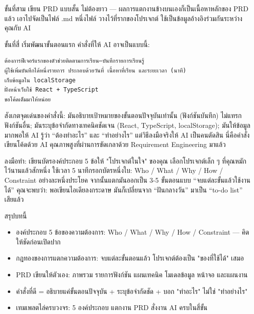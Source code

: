 ขั้นที่สาม เขียน PRD แบบสั้น ไม่ต้องยาว — ผลการแตกงานข้างบนเองก็เป็นเนื้อหาหลักของ PRD แล้ว เอาไปจัดเป็นไฟล์ .md หนึ่งไฟล์ วางไว้ที่รากของโปรเจกต์ ใช้เป็นข้อมูลอ้างอิงร่วมกันระหว่างคุณกับ AI

ขั้นที่สี่ เริ่มพัฒนาขั้นตอนแรก คำสั่งที่ให้ AI อาจเป็นแบบนี้:

\begin{lstlisting}
ต้องการฟีเจอร์แรกของตัวช่วยติดตามการเรียน—บันทึกรายการเรียนรู้
ผู้ใช้เพิ่มบันทึกได้หนึ่งรายการ ประกอบด้วยวันที่ เนื้อหาที่เรียน และระยะเวลา (นาที)
เก็บข้อมูลใน localStorage
ฝั่งหน้าเว็บใช้ React + TypeScript
ขอโค้ดเต็มมาให้หน่อย
\end{lstlisting}

สังเกตจุดเด่นของคำสั่งนี้: มันอธิบายเป้าหมายของขั้นตอนปัจจุบันเท่านั้น (ฟังก์ชันบันทึก) ไม่แทรกฟังก์ชันอื่น; มันระบุข้อจำกัดทางเทคนิคชัดเจน (React, TypeScript, localStorage); มันให้ข้อมูลมากพอให้ AI รู้ว่า “ต้องทำอะไร” และ “ทำอย่างไร” แต่วิธีลงมือจริงให้ AI เป็นคนตัดสิน นี่คือคำสั่งเขียนโค้ดด้วย AI คุณภาพสูงที่ผ่านการขัดเกลาด้วย Requirement Engineering มาแล้ว

\begin{tcbpractice}{ลงมือทำ: เขียนบัตรองค์ประกอบ 5 ข้อให้ "โปรเจกต์ในใจ" ของคุณ}
เลือกโปรเจกต์เล็ก ๆ ที่คุณหมักไว้นานแล้วสักหนึ่ง ใช้เวลา 5 นาทีกรอกบัตรหนึ่งใบ: Who / What / Why / How / Constraint อย่างละหนึ่งประโยค จากนั้นแตกมันออกเป็น 3-5 ขั้นตอนแบบ “จบแต่ละขั้นแล้วใช้งานได้” คุณจะพบว่า: พอเขียนไอเดียลงกระดาษ มันก็เปลี่ยนจาก “ฝันกลางวัน” มาเป็น “to-do list” เสียแล้ว

\end{tcbpractice}

\begin{tcbsummary}{สรุปบทนี้}
\begin{itemize}
  \item องค์ประกอบ 5 ข้อของความต้องการ: Who / What / Why / How / Constraint — คิดให้ชัดก่อนเปิดปาก
  \item กฎทองของการแตกความต้องการ: จบแต่ละขั้นตอนแล้ว โปรเจกต์ต้องเป็น "ของที่ใช้ได้" เสมอ
  \item PRD เขียนให้ตัวเอง: ภาพรวม รายการฟังก์ชัน แผนเทคนิค โมเดลข้อมูล หน้าจอ และแผนงาน
  \item คำสั่งที่ดี = อธิบายแค่ขั้นตอนปัจจุบัน + ระบุข้อจำกัดชัด + บอก "ทำอะไร" ไม่ใช่ "ทำอย่างไร"
  \item เทมเพลตไล่ครบวงจร: 5 องค์ประกอบ แตกงาน PRD สั่งงาน AI ครบในสี่ขั้น
\end{itemize}

\end{tcbsummary}
